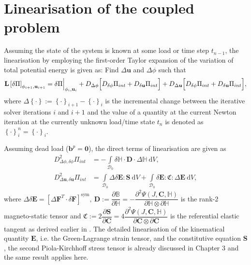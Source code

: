 \section{Linearisation of the coupled problem}
Assuming the state of the system is known at some load or time step $t_{n-1}$, the linearisation by employing the first-order Taylor expansion of the variation of total potential energy is given as: Find $\Delta \mathbf{u}$ and $\Delta \phi$ such that
\begin{equation}
\mathbf{L} \left[ \delta \Pi \right]_{\phi_{i+1}, \mathbf{u}_{i+1}} = \delta \Pi \Big{|}_{\phi_i, \mathbf{u}_i} + D_{\Delta \phi} \Big[ D_{\delta \phi} \Pi_{int} + D_{\delta \mathbf{u}} \Pi_{int} \Big] + D_{\Delta \mathbf{u}} \Big[ D_{\delta \phi} \Pi_{int} + D_{\delta \mathbf{u}} \Pi_{int} \Big],
\label{eq:3.29}
\end{equation} 
where $\Delta \left\lbrace \cdot \right\rbrace := \left\lbrace \cdot \right\rbrace_{i+1} - \left\lbrace \cdot \right\rbrace_i$ is the incremental change between the iterative solver iterations $i$ and $i+1$ and the value of a quantity at the current Newton iteration at the currently unknown load/time state $t_n$ is denoted as $\left\lbrace \cdot \right\rbrace_i^n = \left\lbrace \cdot \right\rbrace_i$.

Assuming dead load ($\mathbf{b}^p = \mathbf{0}$), the direct terms of linearisation are given as
\begin{align}
D^2_{\Delta \phi, \delta \phi} \Pi_{int} &= - \int\limits_{\mathcal{D}_0} \delta \mathbb{H} \cdot \mathbf{D} \cdot \Delta \mathbb{H} \ \mathrm{d}V, \label{eq:3.30.1}\\
D^2_{\Delta \mathbf{u}, \delta \mathbf{u}} \Pi_{int} &= \int\limits_{\mathcal{D}_0} \Delta \delta \mathbf{E} : \mathbf{S} \ \mathrm{d}V + \int\limits_{\mathcal{D}_0} \delta \mathbf{E} : \mathfrak{C} : \Delta \mathbf{E} \ \mathrm{d}V, \label{eq:3.30.2}
\end{align}
where $\Delta \delta \mathbf{E} = \left[ \Delta \mathbf{F}^T \cdot \delta \mathbf{F} \right]^{\text{sym}}, \ \mathbf{D} := \dfrac{\partial \mathbb{B}}{\partial \mathbb{H}} = -\dfrac{\partial^2 \Psi (J, \mathbf{C}, \mathbb{H})}{\partial \mathbb{H} \otimes \partial \mathbb{H}}$ is the rank-2 magneto-static tensor and $\mathfrak{C} := 2\dfrac{\partial \mathbf{S}}{\partial \mathbf{C}} = 4\dfrac{\partial^2 \Psi (J, \mathbf{C}, \mathbb{H})}{\partial \mathbf{C} \otimes \partial \mathbf{C}}$ is the referential elastic tangent as derived earlier in . The detailed linearisation of the kinematical quantity $\mathbf{E}$, i.e. the Green-Lagrange strain tensor, and the constitutive equation $\mathbf{S}$, the second Piola-Kirchhoff stress tensor is already discussed in Chapter 3 and the same result applies here. \par 

